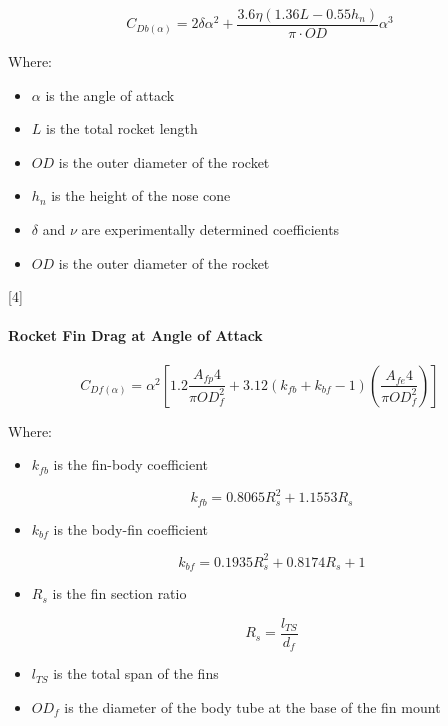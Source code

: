 \documentclass[]{article}
\providecommand{\tightlist}{%
  \setlength{\itemsep}{0pt}\setlength{\parskip}{0pt}}
\let\oldparagraph\paragraph
\renewcommand{\paragraph}[1]{\oldparagraph{#1}\mbox{}}
\begin{document}
\begin{equation}
\label{eq_rocket_body_drag_aoa}
C_{Db(\alpha)} = 2 \delta \alpha^2 + \dfrac{3.6 \eta (1.36 L - 0.55 h_n ) }{ \pi \cdot OD } \alpha^3
\end{equation}

Where:

\begin{itemize}
\tightlist
\item
  \(\alpha\) is the angle of attack
\item
  \(L\) is the total rocket length
\item
  \(OD\) is the outer diameter of the rocket
\item
  \(h_n\) is the height of the nose cone
\item
  \(\delta\) and \(\nu\) are experimentally determined coefficients
\item
  \(OD\) is the outer diameter of the rocket
\end{itemize}

{[}4{]}

\paragraph{Rocket Fin Drag at Angle of
Attack}\label{rocket-fin-drag-at-angle-of-attack}

\begin{equation}
\label{eq_rocket_fin_drag_aoa}
C_{Df(\alpha)} = \alpha^2 \left[ 1.2 \dfrac{A_{fp}4}{\pi OD^2_f} + 3.12 (k_{fb} + k_{bf} - 1) \left( \dfrac{A_{fe} 4}{\pi OD^2_f} \right) \right]
\end{equation}

Where:

\begin{itemize}
\tightlist
\item
  \(k_{fb}\) is the fin-body coefficient

  \begin{equation}
  \label{eq_fin_body_coef_aoa}
  k_{fb} = 0.8065 R^2_s + 1.1553 R_s
  \end{equation}
\item
  \(k_{bf}\) is the body-fin coefficient

  \begin{equation}
  \label{eq_body_fin_coef_aoa}
  k_{bf} = 0.1935 R^2_s + 0.8174 R_s + 1
  \end{equation}
\item
  \(R_s\) is the fin section ratio

  \begin{equation}
  \label{eq_fin_section_ratio}
  R_s = \dfrac{l_{TS}}{d_f}
  \end{equation}
\item
  \(l_{TS}\) is the total span of the fins
\item
  \(OD_f\) is the diameter of the body tube at the base of the fin mount
\end{itemize}
\end{document}
